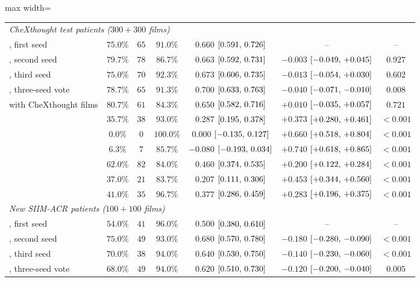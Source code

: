\begin{table}[!htbp]
\begin{adjustbox}{max width=\linewidth}
\begin{tabular}{l ccc c cc}
\midrule
\multicolumn{7}{l}{\emph{CheXthought test patients ($300 + 300$ films)}} \\
\msn{}, first seed & $75.0\%$ & $65$ & $91.0\%$ & $0.660$ $[0.591,\,0.726]$ & -- & -- \\
\msn{}, second seed & $79.7\%$ & $78$ & $86.7\%$ & $0.663$ $[0.592,\,0.731]$ & $-0.003$ $[-0.049,\,+0.045]$ & $0.927$ \\
\msn{}, third seed & $75.0\%$ & $70$ & $92.3\%$ & $0.673$ $[0.606,\,0.735]$ & $-0.013$ $[-0.054,\,+0.030]$ & $0.602$ \\
\msn{}, three-seed vote & $78.7\%$ & $65$ & $91.3\%$ & $0.700$ $[0.633,\,0.763]$ & $-0.040$ $[-0.071,\,-0.010]$ & $0.008$ \\
\msp{} with CheXthought films & $80.7\%$ & $61$ & $84.3\%$ & $0.650$ $[0.582,\,0.716]$ & $+0.010$ $[-0.035,\,+0.057]$ & $0.721$ \\
\msp{} & $35.7\%$ & $38$ & $93.0\%$ & $0.287$ $[0.195,\,0.378]$ & $+0.373$ $[+0.280,\,+0.461]$ & $<0.001$ \\
\ms{} & $0.0\%$ & $0$ & $100.0\%$ & $0.000$ $[-0.135,\,0.127]$ & $+0.660$ $[+0.518,\,+0.804]$ & $<0.001$ \\
\base{} & $6.3\%$ & $7$ & $85.7\%$ & $-0.080$ $[-0.193,\,0.034]$ & $+0.740$ $[+0.618,\,+0.865]$ & $<0.001$ \\
\gem{} & $62.0\%$ & $82$ & $84.0\%$ & $0.460$ $[0.374,\,0.535]$ & $+0.200$ $[+0.122,\,+0.284]$ & $<0.001$ \\
\opus{} & $37.0\%$ & $21$ & $83.7\%$ & $0.207$ $[0.111,\,0.306]$ & $+0.453$ $[+0.344,\,+0.560]$ & $<0.001$ \\
\gpt{} & $41.0\%$ & $35$ & $96.7\%$ & $0.377$ $[0.286,\,0.459]$ & $+0.283$ $[+0.196,\,+0.375]$ & $<0.001$ \\
\midrule
\multicolumn{7}{l}{\emph{New SIIM-ACR patients ($100 + 100$ films)}} \\
\msn{}, first seed & $54.0\%$ & $41$ & $96.0\%$ & $0.500$ $[0.380,\,0.610]$ & -- & -- \\
\msn{}, second seed & $75.0\%$ & $49$ & $93.0\%$ & $0.680$ $[0.570,\,0.780]$ & $-0.180$ $[-0.280,\,-0.090]$ & $<0.001$ \\
\msn{}, third seed & $70.0\%$ & $38$ & $94.0\%$ & $0.640$ $[0.530,\,0.750]$ & $-0.140$ $[-0.230,\,-0.060]$ & $<0.001$ \\
\msn{}, three-seed vote & $68.0\%$ & $49$ & $94.0\%$ & $0.620$ $[0.510,\,0.730]$ & $-0.120$ $[-0.200,\,-0.040]$ & $0.005$ \\

\end{tabular}
\end{adjustbox}
\end{table}
